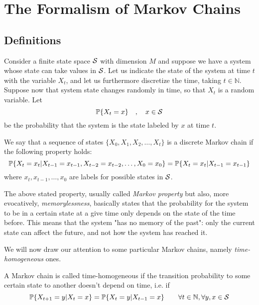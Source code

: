\chapter{The Formalism of Markov Chains}
\section{Definitions}
Consider a finite state space $\mathcal{S}$ with dimension $M$ and suppose we have a system whose state can take values in $\mathcal{S}$. Let us indicate the state of the system at time $t$ with the variable $X_t$, and let us furthermore discretize the time, taking $t \in \mathbb{N}$. Suppose now that system state changes randomly in time, so that $X_t$ is a random variable. Let
\begin{equation}
    \mathbb{P}\{X_t = x\} \quad , \quad x \in \mathcal{S}
\end{equation}
be the probability that the system is the state labeled by $x$ at time $t$.
\begin{ndef}  We say that a sequence of states $\{X_0, X_1, X_2, \dots, X_t\}$ is a discrete Markov chain if the following property holds:
    \begin{equation}
        \mathbb{P}\{ X_t = x_t | X_{t-1} = x_{t-1}, X_{t-2} = x_{t-2}, \dots, X_0 = x_0 \} = \mathbb{P}\{ X_t = x_t | X_{t-1} = x_{t-1} \}
    \end{equation}
    where $x_t, x_{t-1}, \dots, x_{0}$ are labels for possible states in $\mathcal{S}$.
\end{ndef}
The above stated property, usually called \emph{Markov property} but also, more evocatively, \emph{memorylessness}, basically states that the probability for the system to be in a certain state at a give time only depends on the state of the time before. This means that the system "has no memory of the past": only the current state can affect the future, and not how the system has reached it.

We will now draw our attention to some particular Markov chains, namely \emph{time-homogeneous} ones.
\begin{ndef}  A Markov chain is called time-homogeneous if the transition probability to some certain state to another doesn't depend on time, i.e. if
    \begin{equation}
        \mathbb{P}\{X_{t+1} = y | X_{t} = x\} = \mathbb{P}\{X_{t} = y | X_{t-1} = x\} \quad \quad \forall t\in \mathbb{N}, \forall y, x \in \mathcal{S}
    \end{equation}
\end{ndef}

